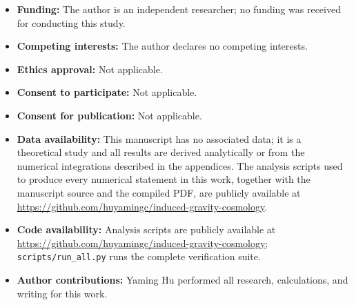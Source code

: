 \documentclass[pdflatex,sn-mathphys-num]{sn-jnl}
\theoremstyle{thmstyleone}
\begin{document}
\begin{itemize}
\item \textbf{Funding:} The author is an independent researcher; no funding was received for conducting this study.
\item \textbf{Competing interests:} The author declares no competing interests.
\item \textbf{Ethics approval:} Not applicable.
\item \textbf{Consent to participate:} Not applicable.
\item \textbf{Consent for publication:} Not applicable.
\item \textbf{Data availability:} This manuscript has no associated data; it is a theoretical study and all results are derived analytically or from the numerical integrations described in the appendices. The analysis scripts used to produce every numerical statement in this work, together with the manuscript source and the compiled PDF, are publicly available at \url{https://github.com/huyamingc/induced-gravity-cosmology}.
\item \textbf{Code availability:} Analysis scripts are publicly available at \url{https://github.com/huyamingc/induced-gravity-cosmology}; \texttt{scripts/run\_all.py} runs the complete verification suite.
\item \textbf{Author contributions:} Yaming Hu performed all research, calculations, and writing for this work.
\end{itemize}
\end{document}
